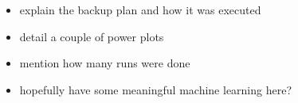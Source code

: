 \begin{itemize}
    \item explain the backup plan and how it was executed
    \item detail a couple of power plots
    \item mention how many runs were done
    \item hopefully have some meaningful machine learning here?
\end{itemize}